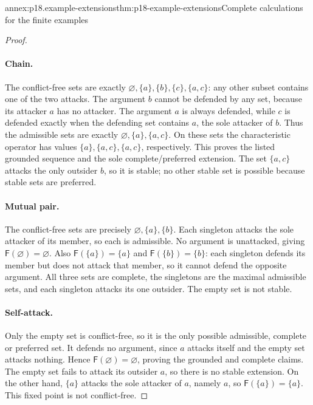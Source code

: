 \begin{annexitem}{annex:p18.example-extensions}{thm:p18-example-extensions}{Complete calculations for the finite examples}
\begin{proof}
\paragraph{Chain.}
The conflict-free sets are exactly
\(\varnothing,\{a\},\{b\},\{c\},\{a,c\}\): any other subset
contains one of the two attacks. The argument \(b\) cannot be defended
by any set, because its attacker \(a\) has no attacker. The argument
\(a\) is always defended, while \(c\) is defended exactly when
the defending set contains \(a\), the sole attacker of \(b\).
Thus the admissible sets are exactly
\(\varnothing,\{a\},\{a,c\}\). On these sets the characteristic
operator has values \(\{a\},\{a,c\},\{a,c\}\), respectively.
This proves the listed grounded sequence and the sole complete/preferred
extension. The set \(\{a,c\}\) attacks the only outsider \(b\), so
it is stable; no other stable set is possible because stable sets are preferred.

\paragraph{Mutual pair.}
The conflict-free sets are precisely \(\varnothing,\{a\},\{b\}\).
Each singleton attacks the sole attacker of its member, so each is admissible.
No argument is unattacked, giving \(\mathsf F(\varnothing)=\varnothing\).
Also \(\mathsf F(\{a\})=\{a\}\) and
\(\mathsf F(\{b\})=\{b\}\): each singleton defends its member but
does not attack that member, so it cannot defend the opposite argument.
All three sets are complete, the singletons are the maximal admissible sets,
and each singleton attacks its one outsider. The empty set is not stable.

\paragraph{Self-attack.}
Only the empty set is conflict-free, so it is the only possible admissible,
complete or preferred set. It defends no argument, since \(a\) attacks
itself and the empty set attacks nothing. Hence
\(\mathsf F(\varnothing)=\varnothing\), proving the grounded and
complete claims. The empty set fails to attack its outsider \(a\), so
there is no stable extension. On the other hand, \(\{a\}\) attacks
the sole attacker of \(a\), namely \(a\), so
\(\mathsf F(\{a\})=\{a\}\). This fixed point is not conflict-free.


\end{proof}
\end{annexitem}
